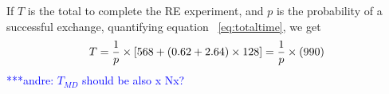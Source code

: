\documentclass{rspublic}
\newcommand{\alnote}[1]{ {\textcolor{blue} { ***andre: #1 }}}
\newcommand{\alnote}[1]{}
\begin{document}
If $T$ is the total to complete the RE experiment, and $p$ is
the probability of a successful exchange, quantifying equation
~\ref{eq:totaltime}, we get 
\begin{eqnarray}
T=  {1 \over p} \times {[ 568+ (0.62 + 2.64)\times 128]} = {1 \over p} \times (990)
\label{eq:timebt}
\end{eqnarray}
\alnote{$T_{MD}$ should be also x Nx?}


\end{document}
